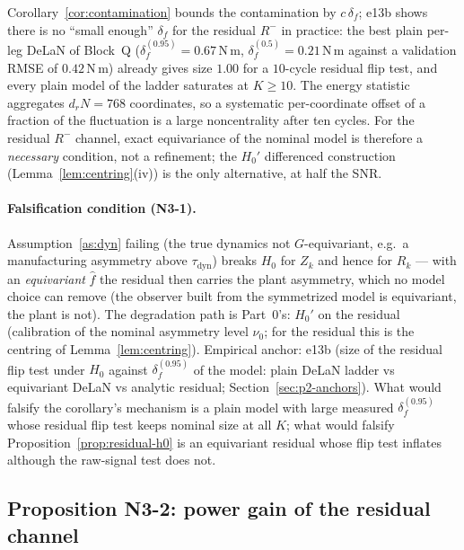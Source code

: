 \begin{remark}
\label{rem:necessity}
Corollary~\ref{cor:contamination} bounds the contamination by $c\,\delta_f$;
e13b shows there is no ``small enough'' $\delta_f$ for the residual $R^-$ in
practice: the best plain per-leg DeLaN of Block~Q ($\delta_f^{(0.95)} =
0.67$\,N\,m, $\delta_f^{(0.5)} = 0.21$\,N\,m against a validation RMSE of
$0.42$\,N\,m) already gives size $1.00$ for a $10$-cycle residual flip test,
and every plain model of the ladder saturates at $K \ge 10$. The energy
statistic aggregates $d_r N = 768$ coordinates, so a systematic per-coordinate
offset of a fraction of the fluctuation is a large noncentrality after ten
cycles. For the residual $R^-$ channel, exact equivariance of the nominal
model is therefore a \emph{necessary} condition, not a refinement; the
$H_0'$ differenced construction (Lemma~\ref{lem:centring}(iv)) is the only
alternative, at half the SNR.
\end{remark}

\paragraph{Falsification condition (N3-1).}
Assumption~\ref{as:dyn} failing (the true dynamics not $G$-equivariant, e.g.\
a manufacturing asymmetry above $\tau_{\mathrm{dyn}}$) breaks $H_0$ for
$Z_k$ and hence for $R_k$ --- with an \emph{equivariant} $\hat f$ the
residual then carries the plant asymmetry, which no model choice can remove
(the observer built from the symmetrized model is equivariant, the plant is
not). The degradation path is Part~0's: $H_0'$ on the residual (calibration
of the nominal asymmetry level $\nu_0$; for the residual this is the
centring of Lemma~\ref{lem:centring}). Empirical anchor: e13b (size of the
residual flip test under $H_0$ against $\delta_f^{(0.95)}$ of the model:
plain DeLaN ladder vs equivariant DeLaN vs analytic residual;
Section~\ref{sec:p2-anchors}). What would falsify the corollary's mechanism
is a plain model with large measured $\delta_f^{(0.95)}$ whose residual flip
test keeps nominal size at all $K$; what would falsify
Proposition~\ref{prop:residual-h0} is an equivariant residual whose flip
test inflates although the raw-signal test does not.

\subsection{Proposition N3-2: power gain of the residual channel}
\label{sec:p2-n32}

